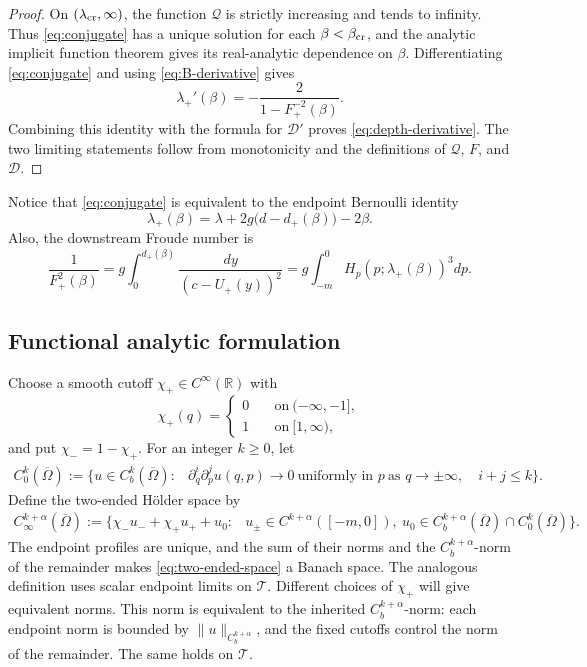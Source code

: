 \documentclass[12pt,letterpaper]{amsart}
\numberwithin{equation}{section}
\def\R{{\mathbb R}}
\begin{document}
	\begin{proof}
		{On $(\lambda_{\rm cr},\infty)$, the function $\mathcal Q$ is strictly increasing and tends to infinity. Thus \eqref{eq:conjugate} has a unique solution for each $\beta<\beta_{\rm cr}$, and the analytic implicit function theorem gives its real-analytic dependence on $\beta$.}  Differentiating
		\eqref{eq:conjugate} and using \eqref{eq:B-derivative} gives
		\[
		\lambda_+'(\beta)=-\frac{2}{1-F_+^{-2}(\beta)}.
		\]
		Combining this identity with the formula for \(\mathcal D'\) proves
		\eqref{eq:depth-derivative}.  The two limiting statements follow from monotonicity
		and the definitions of \(\mathcal Q\), \(F\), and \(\mathcal D\).
	\end{proof}
	Notice that \eqref{eq:conjugate} is equivalent to the endpoint Bernoulli identity
	\begin{equation}\label{eq:endpoint-lambda}
		\lambda_+(\beta)
		=\lambda+2g\bigl(d-d_+(\beta)\bigr)-2\beta.
	\end{equation}
	Also, the downstream Froude number is
	\begin{equation*}
		\frac1{F_+^2(\beta)}
		=g\int_0^{d_+(\beta)}\frac{d y}{(c-U_+(y))^2}
		=g\int_{-m}^0H_p(p;\lambda_+(\beta))^3d p.
	\end{equation*}
	
	
	\subsection{{Functional analytic formulation}}Choose a smooth cutoff \(\chi_+\in C^\infty(\R)\) with
	\begin{equation*}
		\chi_+(q)=\begin{cases}
			0\quad&\mathrm{on~}(-\infty,-1],\\
			1&\mathrm{on~}[1,\infty),
		\end{cases}
	\end{equation*}
	and put \(\chi_-=1-\chi_+\).  For an integer
	\(k\ge0\), let
	\[
	\begin{aligned}
		C_0^k(\overline\Omega):=\bigl\{u\in C_b^k(\overline\Omega):{}&
		\partial_q^i	\partial_p^j u(q,p)\to0\ \text{uniformly in }p~\text{as }q\to\pm\infty,\quad i+j\le k\bigr\}.
	\end{aligned}
	\]
	Define the two-ended H\"older space by
	\begin{equation}\label{eq:two-ended-space}
		\begin{aligned}
			C_\infty^{k+\alpha}(\overline\Omega):=
			\bigl\{\chi_-u_-+\chi_+u_++u_0:{}&
			u_\pm\in C^{k+\alpha}([-m,0]),~u_0\in C_b^{k+\alpha}(\overline\Omega)
			\cap C_0^k(\overline\Omega)\bigr\}.
		\end{aligned}
	\end{equation}
	The endpoint profiles are unique, and the sum of their norms and the
	\(C_b^{k+\alpha}\)-norm of the remainder makes
	\eqref{eq:two-ended-space} a Banach space.  The analogous
	definition uses scalar endpoint limits  on \(\mathcal T\).  Different choices of \(\chi_+\) will give
	equivalent norms.
	This norm is equivalent to the inherited \(C_b^{k+\alpha}\)-norm:
	each endpoint norm is bounded by \(\|u\|_{C_b^{k+\alpha}}\), and the fixed
	cutoffs control the norm of the remainder. The same holds on \(\mathcal T\).
	
\end{document}
